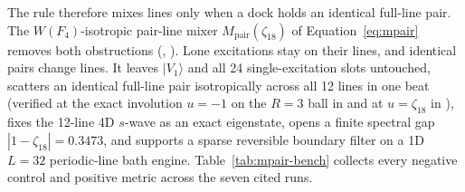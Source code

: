 The rule therefore mixes lines only when a dock holds an identical full-line pair. The $W(F_4)$-isotropic pair-line
mixer $M_{\mathrm{pair}}(\zeta_{18})$ of Equation~\eqref{eq:mpair} removes both obstructions (,
). Lone excitations stay on their lines, and identical pairs change lines. It leaves $|V_1\rangle$
and all 24 single-excitation slots untouched, scatters an identical full-line pair isotropically across all 12 lines in
one beat (verified at the exact involution $u = -1$ on the $R = 3$ ball in  and at $u = \zeta_{18}$ in
\universecode), fixes the 12-line 4D $s$-wave as an exact eigenstate, opens a finite spectral gap $|1 - \zeta_{18}| =
0.3473$, and supports a sparse reversible boundary filter on a 1D $L = 32$ periodic-line bath engine.
Table~\ref{tab:mpair-bench} collects every negative control and positive metric across the seven cited 
runs.

